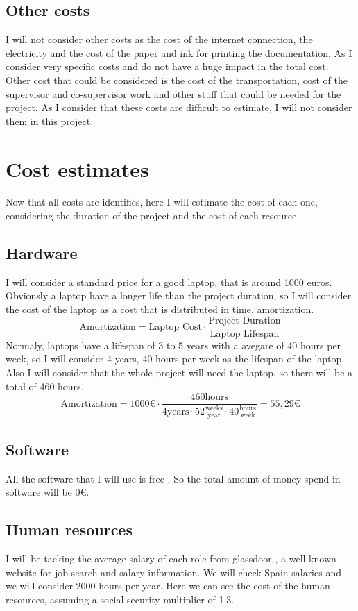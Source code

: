 \subsection*{Other costs}
I will not consider other costs as the cost of the internet connection, the electricity and the cost of the paper and ink for printing the documentation.
As I consider very specific costs and do not have a huge impact in the total cost.
Other cost that could be considered is the cost of the transportation, cost of the supervisor and co-supervisor work and other stuff that could be needed for the project.
As I consider that these costs are difficult to estimate, I will not consider them in this project.
\section{Cost estimates}
Now that all costs are identifies, here I will estimate the cost of each one, considering the duration of the project and the cost of each resource.
\subsection*{Hardware}
I will consider a standard price for a good laptop, that is around 1000 euros.
Obviously a laptop have a longer life than the project duration, so I will consider the cost of the laptop as a cost that is distributed in time, amortization.
$$
\text{Amortization} = \text{Laptop Cost} \cdot \frac{\text{Project Duration}}{\text{Laptop Lifespan}}
$$ 
Normaly, laptops have a lifespan of 3 to 5 years with a avegare of 40 hours per week, so I will consider 4 years, 40 hours per week as the lifespan of the laptop. \cite{}
Also I will consider that the whole project will need the laptop, so there will be a total of 460 hours. 
$$
\text{Amortization} = 1000 \text{€} \cdot \frac{460 \text{hours}}{4 \text{years} \cdot 52 \frac{\text{weeks}}{\text{year}} \cdot 40 \frac{\text{hours}}{\text{week}}} = 55,29 \text{€}
$$
\subsection*{Software}
All the software that I will use is free \cite{}. So the total amount of money spend in software will be 0€.
\subsection*{Human resources}
I will be tacking the average salary of each role from glassdoor \cite{GlassDoorResearcher} \cite{GlassdoorProjectManager}\cite{GlassdoorSoftwareDeveloper}, a well known website for job search and salary information.
We will check Spain salaries and we will consider 2000 hours per year.
Here we can see the cost of the human resources, assuming a social security multiplier of 1.3.

